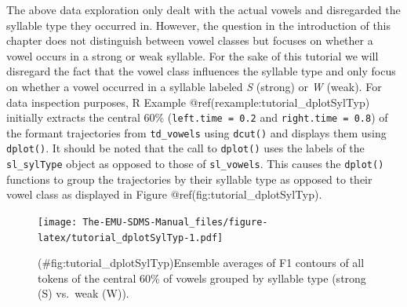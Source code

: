 \documentclass[]{book}
\newenvironment{Shaded}{\begin{snugshade}}{\end{snugshade}}
\newcommand{\KeywordTok}[1]{\textcolor[rgb]{0.13,0.29,0.53}{\textbf{{#1}}}}
\newcommand{\DataTypeTok}[1]{\textcolor[rgb]{0.13,0.29,0.53}{{#1}}}
\newcommand{\DecValTok}[1]{\textcolor[rgb]{0.00,0.00,0.81}{{#1}}}
\newcommand{\FloatTok}[1]{\textcolor[rgb]{0.00,0.00,0.81}{{#1}}}
\newcommand{\StringTok}[1]{\textcolor[rgb]{0.31,0.60,0.02}{{#1}}}
\newcommand{\CommentTok}[1]{\textcolor[rgb]{0.56,0.35,0.01}{\textit{{#1}}}}
\newcommand{\OtherTok}[1]{\textcolor[rgb]{0.56,0.35,0.01}{{#1}}}
\newcommand{\NormalTok}[1]{{#1}}
\theoremstyle{definition}
\theoremstyle{definition}
\theoremstyle{definition}
\theoremstyle{remark}
\begin{document}
The above data exploration only dealt with the actual vowels and
disregarded the syllable type they occurred in. However, the question in
the introduction of this chapter does not distinguish between vowel
classes but focuses on whether a vowel occurs in a strong or weak
syllable. For the sake of this tutorial we will disregard the fact that
the vowel class influences the syllable type and only focus on whether a
vowel occurred in a syllable labeled \emph{S} (strong) or \emph{W}
(weak). For data inspection purposes, R Example
@ref(rexample:tutorial\_dplotSylTyp) initially extracts the central 60\%
(\texttt{left.time\ =\ 0.2} and \texttt{right.time\ =\ 0.8}) of the
formant trajectories from \texttt{td\_vowels} using \texttt{dcut()} and
displays them using \texttt{dplot()}. It should be noted that the call
to \texttt{dplot()} uses the labels of the \texttt{sl\_sylType} object
as opposed to those of \texttt{sl\_vowels}. This causes the
\texttt{dplot()} functions to group the trajectories by their syllable
type as opposed to their vowel class as displayed in Figure
@ref(fig:tutorial\_dplotSylTyp).

\begin{Shaded}
\end{Shaded}

\begin{figure}
\centering
\texttt{[image: The-EMU-SDMS-Manual\_files/figure-latex/tutorial\_dplotSylTyp-1.pdf]}
\caption{(\#fig:tutorial\_dplotSylTyp)Ensemble averages of F1 contours
of all tokens of the central 60\% of vowels grouped by syllable type
(strong (S) vs.~weak (W)).}
\end{figure}
\end{document}
